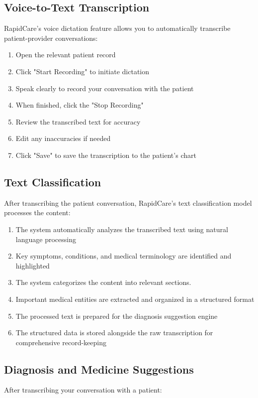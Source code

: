 \documentclass[12pt, titlepage]{article}
\begin{document}
\subsection{Voice-to-Text Transcription}
RapidCare's voice dictation feature allows you to automatically transcribe patient-provider conversations:

\begin{enumerate}
\item Open the relevant patient record
\item Click "Start Recording" to initiate dictation
\item Speak clearly to record your conversation with the patient
\item When finished, click the "Stop Recording"
\item Review the transcribed text for accuracy
\item Edit any inaccuracies if needed
\item Click "Save" to save the transcription to the patient's chart
\end{enumerate}

\subsection{Text Classification}
After transcribing the patient conversation, RapidCare's text classification model processes the content:
\begin{enumerate}
\item The system automatically analyzes the transcribed text using natural language processing
\item Key symptoms, conditions, and medical terminology are identified and highlighted
\item The system categorizes the content into relevant sections.
\item Important medical entities are extracted and organized in a structured format
\item The processed text is prepared for the diagnosis suggestion engine
\item The structured data is stored alongside the raw transcription for comprehensive record-keeping
\end{enumerate}

\subsection{Diagnosis and Medicine Suggestions}
After transcribing your conversation with a patient:
\end{document}
